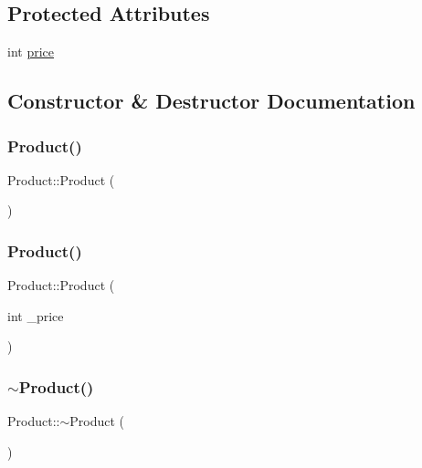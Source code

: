 \subsection*{Protected Attributes}
\begin{DoxyCompactItemize}
\item 
int \mbox{\hyperlink{classProduct_a06761b1d08d2b3fb032b1b9a13d90782}{price}}
\end{DoxyCompactItemize}


\subsection{Constructor \& Destructor Documentation}
\mbox{\label{classProduct_a847c1d85e67ce387166a597579a55135}} 
\subsubsection{\texorpdfstring{Product()}{Product()}\hspace{0.1cm}{\footnotesize\ttfamily [1/2]}}
{\footnotesize\ttfamily Product\+::\+Product (\begin{DoxyParamCaption}{ }\end{DoxyParamCaption})}

\mbox{\label{classProduct_a8befa76d00142c3fca908ba3e235eb15}} 
\subsubsection{\texorpdfstring{Product()}{Product()}\hspace{0.1cm}{\footnotesize\ttfamily [2/2]}}
{\footnotesize\ttfamily Product\+::\+Product (\begin{DoxyParamCaption}\item[{int}]{\+\_\+price }\end{DoxyParamCaption})}

\mbox{\label{classProduct_abe0afd3bea96d979185ec2cfdf681e6f}} 
\subsubsection{\texorpdfstring{$\sim$Product()}{~Product()}}
{\footnotesize\ttfamily Product\+::$\sim$\+Product (\begin{DoxyParamCaption}{ }\end{DoxyParamCaption})}



